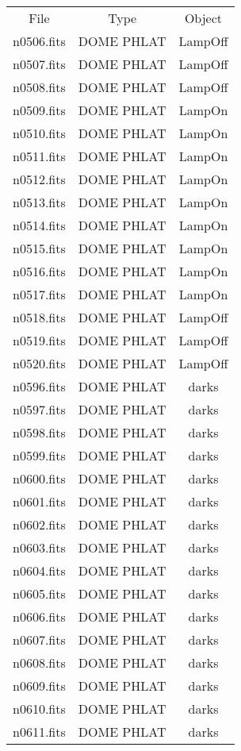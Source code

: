 \begin{table}
\begin{tabular}{ccc}
File & Type & Object \\
n0506.fits & DOME PHLAT & LampOff \\
n0507.fits & DOME PHLAT & LampOff \\
n0508.fits & DOME PHLAT & LampOff \\
n0509.fits & DOME PHLAT & LampOn \\
n0510.fits & DOME PHLAT & LampOn \\
n0511.fits & DOME PHLAT & LampOn \\
n0512.fits & DOME PHLAT & LampOn \\
n0513.fits & DOME PHLAT & LampOn \\
n0514.fits & DOME PHLAT & LampOn \\
n0515.fits & DOME PHLAT & LampOn \\
n0516.fits & DOME PHLAT & LampOn \\
n0517.fits & DOME PHLAT & LampOn \\
n0518.fits & DOME PHLAT & LampOff \\
n0519.fits & DOME PHLAT & LampOff \\
n0520.fits & DOME PHLAT & LampOff \\
n0596.fits & DOME PHLAT & darks \\
n0597.fits & DOME PHLAT & darks \\
n0598.fits & DOME PHLAT & darks \\
n0599.fits & DOME PHLAT & darks \\
n0600.fits & DOME PHLAT & darks \\
n0601.fits & DOME PHLAT & darks \\
n0602.fits & DOME PHLAT & darks \\
n0603.fits & DOME PHLAT & darks \\
n0604.fits & DOME PHLAT & darks \\
n0605.fits & DOME PHLAT & darks \\
n0606.fits & DOME PHLAT & darks \\
n0607.fits & DOME PHLAT & darks \\
n0608.fits & DOME PHLAT & darks \\
n0609.fits & DOME PHLAT & darks \\
n0610.fits & DOME PHLAT & darks \\
n0611.fits & DOME PHLAT & darks \\

\end{tabular}
\end{table}
